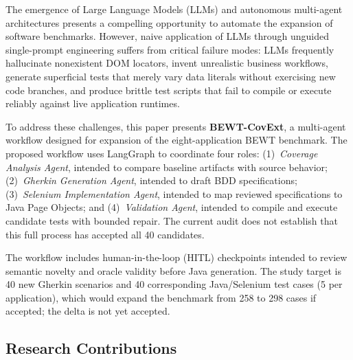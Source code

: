 \documentclass[pdflatex,sn-mathphys-num]{sn-jnl}
\begin{document}
The emergence of Large Language Models (LLMs) and autonomous multi-agent architectures presents a compelling opportunity to automate the expansion of software benchmarks. However, naive application of LLMs through unguided single-prompt engineering suffers from critical failure modes: LLMs frequently hallucinate nonexistent DOM locators, invent unrealistic business workflows, generate superficial tests that merely vary data literals without exercising new code branches, and produce brittle test scripts that fail to compile or execute reliably against live application runtimes.

To address these challenges, this paper presents \textbf{BEWT-CovExt}, a multi-agent workflow designed for expansion of the eight-application BEWT benchmark. The proposed workflow uses LangGraph \cite{langgraph2024} to coordinate four roles: (1)~\textit{Coverage Analysis Agent}, intended to compare baseline artifacts with source behavior; (2)~\textit{Gherkin Generation Agent}, intended to draft BDD specifications; (3)~\textit{Selenium Implementation Agent}, intended to map reviewed specifications to Java Page Objects; and (4)~\textit{Validation Agent}, intended to compile and execute candidate tests with bounded repair. The current audit does not establish that this full process has accepted all 40 candidates.

The workflow includes human-in-the-loop (HITL) checkpoints intended to review semantic novelty and oracle validity before Java generation. The study target is 40 new Gherkin scenarios and 40 corresponding Java/Selenium test cases (5 per application), which would expand the benchmark from 258 to 298 cases if accepted; the delta is not yet accepted.

\subsection{Research Contributions}
\end{document}
